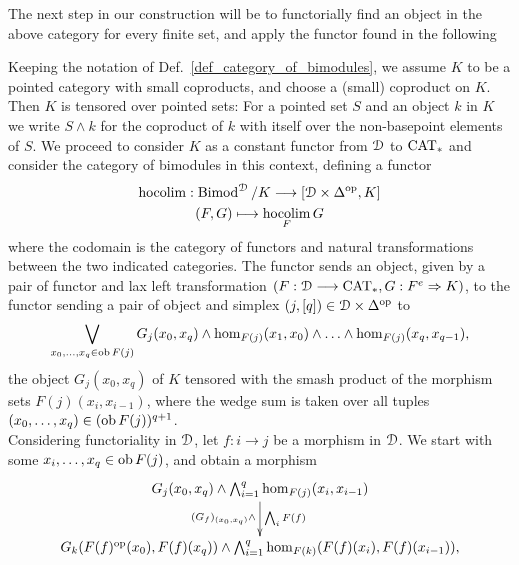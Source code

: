     The next step in our construction will be to functorially find an object in
    the above category for every finite set, and apply the functor found in the
    following
    \begin{defn}\label{def_hocolim}
      Keeping the notation of Def.~\ref{def_category_of_bimodules}, we assume
      $K$ to be a pointed category with small coproducts, and choose a (small)
      coproduct on $K$.  Then $K$ is tensored over pointed sets: For a pointed
      set $S$ and an object $k$ in $K$ we write $S \wedge k$ for the coproduct
      of $k$ with itself over the non-basepoint elements of $S$.
      We proceed to consider $K$ as a constant functor from $\mathcal{D}$ to $\mathrm{CAT}_*$
      and consider the category of bimodules in this context, defining a functor
      \begin{gather*}
        \operatorname*{hocolim}: \operatorname{Bimod}^{\mathcal{D}} / K \longrightarrow [\mathcal{D} \times \Delta^{\mathrm{op}}, K]\\
        (F,G) \longmapsto \operatorname*{hocolim}_F G
      \end{gather*}
      where the codomain is the category of functors and natural transformations
      between the two indicated categories.
      The functor sends an object, given by a pair of functor and lax left
      transformation $(F: \mathcal{D} \longrightarrow \mathrm{CAT}_*, G: F^e \Rightarrow K)$, to the functor
      sending a pair of object and simplex $(j,[q]) \in \mathcal{D} \times
      \Delta^\mathrm{op}$ to
      \begin{displaymath}
        \bigvee_{x_0, \ldots, x_q \in \ob F(j)} %
          G_j(x_0,x_q) \wedge %
          \hom_{F(j)}(x_1,x_0) \wedge \ldots \wedge \hom_{F(j)}(x_q,x_{q-1}),
      \end{displaymath}
      the object $G_j(x_0,x_q)$ of $K$ tensored with the smash product of the
      morphism sets $F(j)(x_i,x_{i-1})$, where the wedge sum is taken over all
      tuples $(x_0, \ldots, x_q) \in (\operatorname{ob} F(j))^{q+1}$.\\
      Considering functoriality in $\mathcal{D}$, let $f: i \to j$ be a morphism in $\mathcal{D}$.
      We start with some $x_i, \ldots, x_q \in \operatorname{ob} F(j)$, and obtain a morphism
      \begin{displaymath}
        \xymatrix{
          G_j(x_0,x_q) \wedge \bigwedge_{i=1}^q \hom_{F(j)}(x_i,x_{i-1}) %
            \ar[d]_{(G_f)_{(x_0,x_q)} \wedge}^{\bigwedge_i F(f)}
          \\
          G_k(F(f)^{\mathrm{op}}(x_0),F(f)(x_q)) \wedge %
            \bigwedge_{i=1}^q \hom_{F(k)}(F(f)(x_i),F(f)(x_{i-1})),  
        }
      \end{displaymath}

\end{defn}
